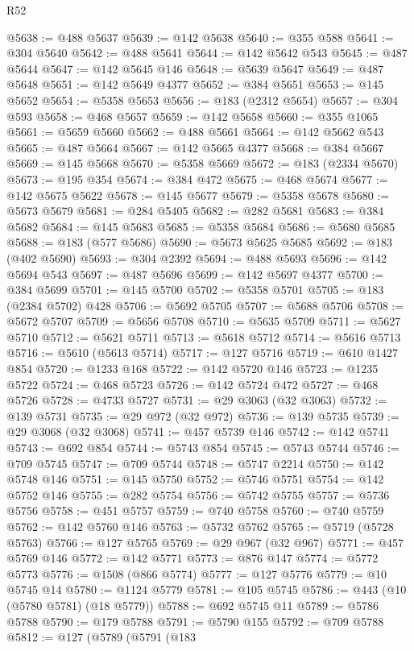 \begin{lexlean}{R52}
\begin{coremodule}
@5638 := @488 @5637
@5639 := @142 @5638
@5640 := @355 @588
@5641 := @304 @5640
@5642 := @488 @5641
@5644 := @142 @5642 @543
@5645 := @487 @5644
@5647 := @142 @5645 @146
@5648 := @5639 @5647
@5649 := @487 @5648
@5651 := @142 @5649 @4377
@5652 := @384 @5651
@5653 := @145 @5652
@5654 := @5358 @5653
@5656 := @183 (@2312 @5654)
@5657 := @304 @593
@5658 := @468 @5657
@5659 := @142 @5658
@5660 := @355 @1065
@5661 := @5659 @5660
@5662 := @488 @5661
@5664 := @142 @5662 @543
@5665 := @487 @5664
@5667 := @142 @5665 @4377
@5668 := @384 @5667
@5669 := @145 @5668
@5670 := @5358 @5669
@5672 := @183 (@2334 @5670)
@5673 := @195 @354
@5674 := @384 @472
@5675 := @468 @5674
@5677 := @142 @5675 @5622
@5678 := @145 @5677
@5679 := @5358 @5678
@5680 := @5673 @5679
@5681 := @284 @5405
@5682 := @282 @5681
@5683 := @384 @5682
@5684 := @145 @5683
@5685 := @5358 @5684
@5686 := @5680 @5685
@5688 := @183 (@577 @5686)
@5690 := @5673 @5625 @5685
@5692 := @183 (@402 @5690)
@5693 := @304 @2392
@5694 := @488 @5693
@5696 := @142 @5694 @543
@5697 := @487 @5696
@5699 := @142 @5697 @4377
@5700 := @384 @5699
@5701 := @145 @5700
@5702 := @5358 @5701
@5705 := @183 (@2384 @5702) @428
@5706 := @5692 @5705
@5707 := @5688 @5706
@5708 := @5672 @5707
@5709 := @5656 @5708
@5710 := @5635 @5709
@5711 := @5627 @5710
@5712 := @5621 @5711
@5713 := @5618 @5712
@5714 := @5616 @5713
@5716 := @5610 (@5613 @5714)
@5717 := @127 @5716
@5719 := @610 @1427 @854
@5720 := @1233 @168
@5722 := @142 @5720 @146
@5723 := @1235 @5722
@5724 := @468 @5723
@5726 := @142 @5724 @472
@5727 := @468 @5726
@5728 := @4733 @5727
@5731 := @29 @3063 (@32 @3063)
@5732 := @139 @5731
@5735 := @29 @972 (@32 @972)
@5736 := @139 @5735
@5739 := @29 @3068 (@32 @3068)
@5741 := @457 @5739 @146
@5742 := @142 @5741
@5743 := @692 @854
@5744 := @5743 @854
@5745 := @5743 @5744
@5746 := @709 @5745
@5747 := @709 @5744
@5748 := @5747 @2214
@5750 := @142 @5748 @146
@5751 := @145 @5750
@5752 := @5746 @5751
@5754 := @142 @5752 @146
@5755 := @282 @5754
@5756 := @5742 @5755
@5757 := @5736 @5756
@5758 := @451 @5757
@5759 := @740 @5758
@5760 := @740 @5759
@5762 := @142 @5760 @146
@5763 := @5732 @5762
@5765 := @5719 (@5728 @5763)
@5766 := @127 @5765
@5769 := @29 @967 (@32 @967)
@5771 := @457 @5769 @146
@5772 := @142 @5771
@5773 := @876 @147
@5774 := @5772 @5773
@5776 := @1508 (@866 @5774)
@5777 := @127 @5776
@5779 := @10 @5745 @14
@5780 := @1124 @5779
@5781 := @105 @5745
@5786 := @443 (@10 (@5780 @5781) (@18 @5779))
@5788 := @692 @5745 @11
@5789 := @5786 @5788
@5790 := @179 @5788
@5791 := @5790 @155
@5792 := @709 @5788
@5812 := @127
    (@5789
      (@5791
        (@183

\end{coremodule}
\end{lexlean}
